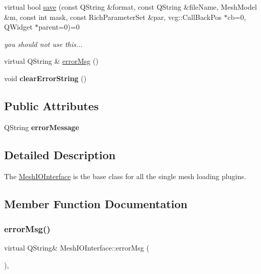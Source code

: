 \begin{DoxyCompactItemize}
\mbox{\label{class_mesh_i_o_interface_a3bce022b7f58758605b738866a0bfae7}} 
virtual bool \hyperlink{class_mesh_i_o_interface_a3bce022b7f58758605b738866a0bfae7}{save} (const Q\+String \&format, const Q\+String \&file\+Name, Mesh\+Model \&m, const int mask, const Rich\+Parameter\+Set \&par, vcg\+::\+Call\+Back\+Pos $\ast$cb=0, Q\+Widget $\ast$parent=0)=0
\begin{DoxyCompactList}\small\item\em you should not use this... \end{DoxyCompactList}\item 
virtual Q\+String \& \hyperlink{class_mesh_i_o_interface_ac0282cd12023ee8802385f2904b85fbc}{error\+Msg} ()
\item 
\mbox{\label{class_mesh_i_o_interface_acb93594a046546ff863321bdebd862e3}} 
void {\bfseries clear\+Error\+String} ()
\end{DoxyCompactItemize}
\subsection*{Public Attributes}
\begin{DoxyCompactItemize}
\item 
\mbox{\label{class_mesh_i_o_interface_a3f20bdc6f40ffd87ec5a34df12a94051}} 
Q\+String {\bfseries error\+Message}
\end{DoxyCompactItemize}


\subsection{Detailed Description}
The \hyperlink{class_mesh_i_o_interface}{Mesh\+I\+O\+Interface} is the base class for all the single mesh loading plugins. 

\subsection{Member Function Documentation}
\mbox{\label{class_mesh_i_o_interface_ac0282cd12023ee8802385f2904b85fbc}} 
\subsubsection{\texorpdfstring{error\+Msg()}{errorMsg()}}
{\footnotesize\ttfamily virtual Q\+String\& Mesh\+I\+O\+Interface\+::error\+Msg (\begin{DoxyParamCaption}{ }\end{DoxyParamCaption})\hspace{0.3cm}{\ttfamily [inline]}, {\ttfamily [virtual]}}

